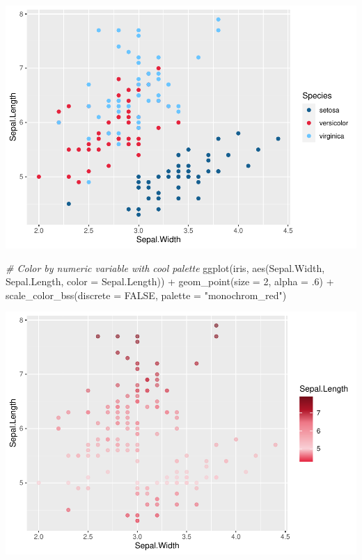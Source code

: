 \documentclass[
]{article}
\newenvironment{Shaded}{\begin{snugshade}}{\end{snugshade}}
\newcommand{\AttributeTok}[1]{\textcolor[rgb]{0.77,0.63,0.00}{#1}}
\newcommand{\CommentTok}[1]{\textcolor[rgb]{0.56,0.35,0.01}{\textit{#1}}}
\newcommand{\ConstantTok}[1]{\textcolor[rgb]{0.00,0.00,0.00}{#1}}
\newcommand{\DecValTok}[1]{\textcolor[rgb]{0.00,0.00,0.81}{#1}}
\newcommand{\FunctionTok}[1]{\textcolor[rgb]{0.00,0.00,0.00}{#1}}
\newcommand{\NormalTok}[1]{#1}
\newcommand{\SpecialCharTok}[1]{\textcolor[rgb]{0.00,0.00,0.00}{#1}}
\newcommand{\StringTok}[1]{\textcolor[rgb]{0.31,0.60,0.02}{#1}}
\begin{document}
\includegraphics[width=1\linewidth]{man/figures/README-scale_color_bss-1}

\begin{Shaded}
\begin{Highlighting}[]

\CommentTok{\# Color by numeric variable with cool palette}
\FunctionTok{ggplot}\NormalTok{(iris, }\FunctionTok{aes}\NormalTok{(Sepal.Width, Sepal.Length, }\AttributeTok{color =}\NormalTok{ Sepal.Length)) }\SpecialCharTok{+}
  \FunctionTok{geom\_point}\NormalTok{(}\AttributeTok{size =} \DecValTok{2}\NormalTok{, }\AttributeTok{alpha =}\NormalTok{ .}\DecValTok{6}\NormalTok{) }\SpecialCharTok{+}
  \FunctionTok{scale\_color\_bss}\NormalTok{(}\AttributeTok{discrete =} \ConstantTok{FALSE}\NormalTok{, }\AttributeTok{palette =} \StringTok{"monochrom\_red"}\NormalTok{)}
\end{Highlighting}
\end{Shaded}

\includegraphics[width=1\linewidth]{man/figures/README-scale_color_bss-2}
\end{document}
